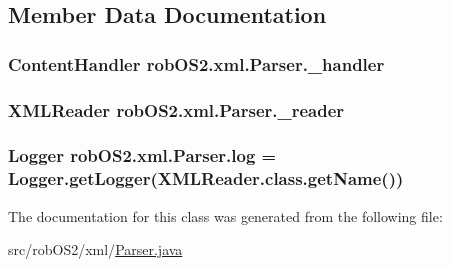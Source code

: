 \subsection{Member Data Documentation}
\hypertarget{classrob_o_s2_1_1xml_1_1_parser_a27b321df2c3a71132c878a8aa3512b10}{
\subsubsection[{\_\-handler}]{\setlength{\rightskip}{0pt plus 5cm}ContentHandler {\bf robOS2.xml.Parser.\_\-handler}}}
\label{classrob_o_s2_1_1xml_1_1_parser_a27b321df2c3a71132c878a8aa3512b10}
\hypertarget{classrob_o_s2_1_1xml_1_1_parser_a1323afac120154d692e1ec0867eeafdc}{
\subsubsection[{\_\-reader}]{\setlength{\rightskip}{0pt plus 5cm}XMLReader {\bf robOS2.xml.Parser.\_\-reader}}}
\label{classrob_o_s2_1_1xml_1_1_parser_a1323afac120154d692e1ec0867eeafdc}
\hypertarget{classrob_o_s2_1_1xml_1_1_parser_a72e36c19f0c4f29dd6f162823f9bb1d4}{
\subsubsection[{log}]{\setlength{\rightskip}{0pt plus 5cm}Logger {\bf robOS2.xml.Parser.log} = Logger.getLogger(XMLReader.class.getName())}}
\label{classrob_o_s2_1_1xml_1_1_parser_a72e36c19f0c4f29dd6f162823f9bb1d4}


The documentation for this class was generated from the following file:\begin{DoxyCompactItemize}
\item 
src/robOS2/xml/\hyperlink{_parser_8java}{Parser.java}\end{DoxyCompactItemize}
